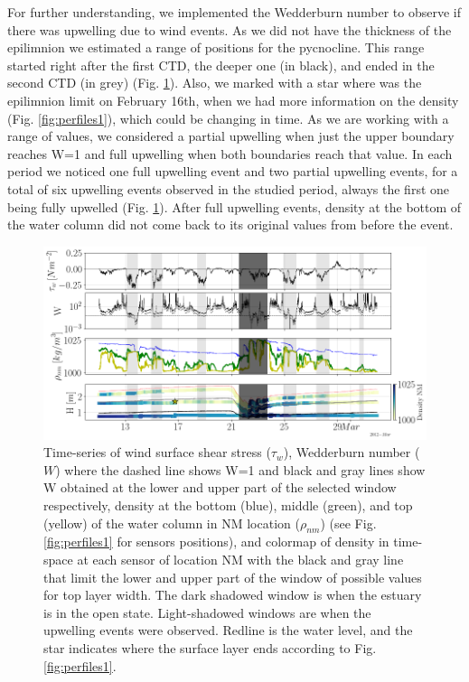 \documentclass[tesis.tex]{subfiles}
\begin{document}
For further understanding, we implemented the Wedderburn number to observe if there was upwelling due to wind events. As we did not have the thickness of the epilimnion we estimated a range of positions for the pycnocline. This range started right after the first CTD, the deeper one (in black), and ended in the second CTD (in grey) (Fig. \ref{fig:wedd}). Also, we marked with a star where was the epilimnion limit on February 16th, when we had more information on the density (Fig. \ref{fig:perfiles1}), which could be changing in time. As we are working with a range of values, we considered a partial upwelling when just the upper boundary reaches W=1 and full upwelling when both boundaries reach that value. In each period we noticed one full upwelling event and two partial upwelling events, for a total of six upwelling events observed in the studied period, always the first one being fully upwelled (Fig. \ref{fig:wedd}). After full upwelling events, density at the bottom of the water column did not come back to its original values from before the event. \\

\begin{figure}[h!]
    \centering
    \includegraphics[width=\textwidth]{Imagenes/wedd.png}
    \caption{Time-series of wind surface shear stress ($\tau_w$), Wedderburn number ($W$) where the dashed line shows W=1 and black and gray lines show W obtained at the lower and upper part of the selected window respectively, density at the bottom (blue), middle (green), and top (yellow) of the water column in NM location ($\rho_{nm}$) (see Fig. \ref{fig:perfiles1} for sensors positions), and colormap of density in time-space at each sensor of location NM with the black and gray line that limit the lower and upper part of the window of possible values for top layer width. The dark shadowed window is when the estuary is in the open state. Light-shadowed windows are when the upwelling events were observed. Redline is the water level, and the star indicates where the surface layer ends according to Fig. \ref{fig:perfiles1}.}
    \label{fig:wedd}
\end{figure}
\end{document}
